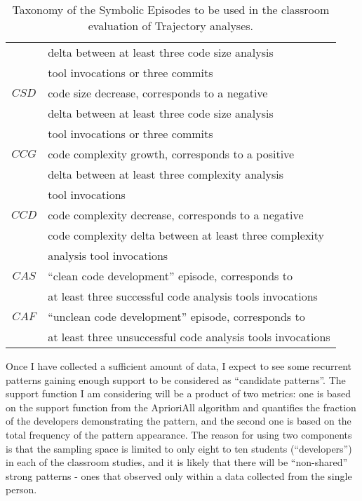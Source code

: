 \begin{table}
\begin{center}
\begin{tabular}{ | c | l | }
													& delta between at least three code size analysis \\
													& tool invocations or three commits \\
		\hline
		$CSD$ 								& code size decrease, corresponds to a negative \\
													& delta between at least three code size analysis \\
													& tool invocations or three commits \\																										
		\hline
		$CCG$ 								& code complexity growth, corresponds to a positive \\
													& delta between at least three complexity analysis \\
													& tool invocations \\
		\hline
		$CCD$ 								& code complexity decrease, corresponds to a negative \\
													& code complexity delta between at least three complexity \\
													& analysis tool invocations \\													
		\hline
		$CAS$ 								& ``clean code development'' episode, corresponds to \\
													& at least three successful code analysis tools invocations \\
		\hline
		$CAF$ 								& ``unclean code development'' episode, corresponds to \\
													& at least three unsuccessful code analysis tools invocations \\
		\hline		
	  \end{tabular}
    \caption{Taxonomy of the Symbolic Episodes to be used in the classroom evaluation of Trajectory analyses.}
    \label{fig:data_collected_intervals}
    \end{center}
\end{table}

Once I have collected a sufficient amount of data, I expect to see some recurrent patterns gaining enough support to be considered as ``candidate patterns''. The support function I am considering will be a product of two metrics: one is based on the support function from the AprioriAll algorithm and quantifies the fraction of the developers demonstrating the pattern, and the second one is based on the total frequency of the pattern appearance. The reason for using two components is that the sampling space is limited to only eight to ten students (``developers'') in each of the classroom studies, and it is likely that there will be ``non-shared'' strong patterns - ones that observed only within a data collected from the single person.

